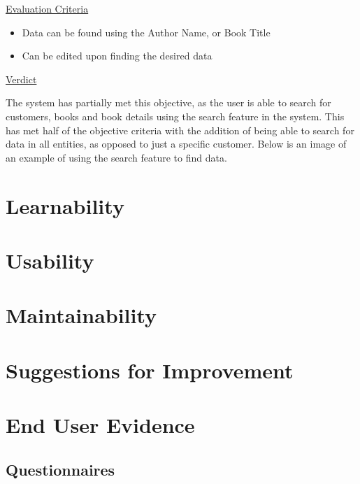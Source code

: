 \underline{Evaluation Criteria}

\begin{itemize}
    \item Data can be found using the Author Name, or Book Title
    \item Can be edited upon finding the desired data
\end{itemize}

\underline{Verdict}

The system has partially met this objective, as the user is able to search for customers, books and book details using the search feature in the system. This has met half of the objective criteria with the addition of being able to search for data in all entities, as opposed to just a specific customer. Below is an image of an example of using the search feature to find data.




\section{Learnability}

\section{Usability}

\section{Maintainability}

\section{Suggestions for Improvement}

\section{End User Evidence}

\subsection{Questionnaires} 

